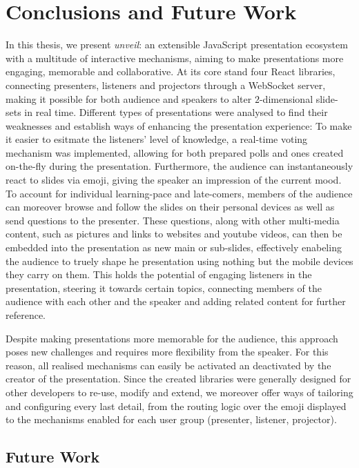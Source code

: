 \chapter{Conclusions and Future Work}
\label{cha:conclusion}

In this thesis, we present \emph{unveil}: an extensible JavaScript presentation eco\-system with a multitude of interactive mechanisms, aiming to make presentations more engaging, memorable and collaborative. At its core stand four React libraries, connecting presenters, listeners and projectors through a WebSocket server, making it possible for both audience and speakers to alter $2$-dimensional slide-sets in real time.
Different types of presentations were analysed to find their weaknesses and establish ways of enhancing the presentation experience: To make it easier to esitmate the listeners' level of knowledge, a real-time voting mechanism was implemented, allowing for both prepared polls and ones created on-the-fly during the presentation. Furthermore, the audience can instantaneously react to slides via emoji, giving the speaker an impression of the current mood. To account for individual learning-pace and late-comers, members of the audience can moreover browse and follow the slides on their personal devices as well as send questions to the presenter.
These questions, along with other multi-media content, such as pictures and links to websites and youtube videos, can then be embedded into the presentation as new main or sub-slides, effectively enabeling the audience to truely shape he presentation using nothing but the mobile devices they carry on them. This holds the potential of engaging listeners in the presentation, steering it towards certain topics, connecting members of the audience with each other and the speaker and adding related content for further reference.

Despite making presentations more memorable for the audience, this approach poses new challenges and requires more flexibility from the speaker. For this reason, all realised mechanisms can easily be activated an deactivated by the creator of the presentation. Since the created libraries were generally designed for other developers to re-use, modify and extend, we moreover offer ways of tailoring and configuring every last detail, from the routing logic over the emoji displayed to the mechanisms enabled for each user group (presenter, listener, projector).

\section{Future Work}
\label{sec:discussion-future-work}

